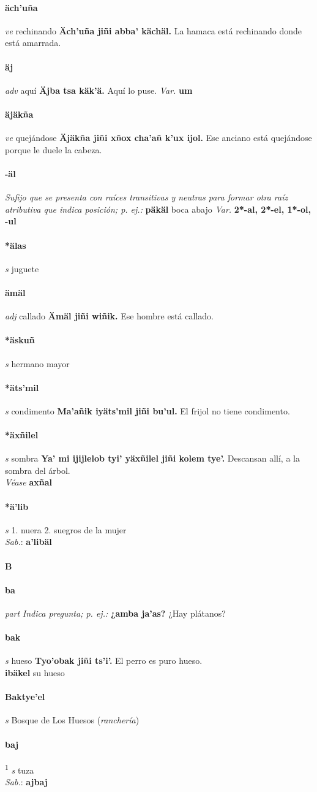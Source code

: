 \documentclass{scrbook}
\newcommand{\entry}[1]{\paragraph{#1}}
\newcommand{\alphaletter}[1]{\addsec{#1}}
\newcommand{\onedefinition}[1]{#1.}
\newcommand{\defsuperscript}[1]{\textsuperscript{1}}
\newcommand{\nontranslationdef}[1]{\textit{#1}}
\newcommand{\partofspeech}[1]{\textit{#1}}
\newcommand{\spanishtranslation}[1]{#1}
\newcommand{\clarification}[1]{(\textit{#1})}
\newcommand{\cholexample}[1]{\textbf{#1}}
\newcommand{\exampletranslation}[1]{#1}
\newcommand{\dialectvariant}[1]{\\\textit{#1}:}
\newcommand{\dialectword}[1]{\textbf{#1}}
\newcommand{\alsosee}[1]{\\\textit{Véase} \textbf{#1}}
\newcommand{\secondaryentry}[1]{\\\textbf{#1}}
\newcommand{\secondtranslation}[1]{#1}
\newcommand{\variation}[1]{\textit{Var.} \textbf{#1}}
\begin{document}
\begin{multicols}{2}
\entry{äch'uña}
\partofspeech{ve}
\spanishtranslation{rechinando}
\cholexample{Äch'uña jiñi abba' kächäl.}
\exampletranslation{La hamaca está rechinando donde está amarrada.}

\entry{äj}
\partofspeech{adv}
\spanishtranslation{aquí}
\cholexample{Äjba tsa käk'ä.}
\exampletranslation{Aquí lo puse.}
\variation{um}

\entry{äjäkña}
\partofspeech{ve}
\spanishtranslation{quejándose}
\cholexample{Äjäkña jiñi xñox cha'añ k'ux ijol.}
\exampletranslation{Ese anciano está quejándose porque le duele la cabeza.}

\entry{-äl}
\nontranslationdef{Sufijo que se presenta con raíces transitivas y neutras para formar otra raíz atributiva que indica posición; p. ej.:}
\cholexample{päkäl}
\exampletranslation{boca abajo}
\variation{2*-al, 2*-el, 1*-ol, -ul}

\entry{*älas}
\partofspeech{s}
\spanishtranslation{juguete}

\entry{ämäl}
\partofspeech{adj}
\spanishtranslation{callado}
\cholexample{Ämäl jiñi wiñik.}
\exampletranslation{Ese hombre está callado.}

\entry{*äskuñ}
\partofspeech{s}
\spanishtranslation{hermano mayor}

\entry{*äts'mil}
\partofspeech{s}
\spanishtranslation{condimento}
\cholexample{Ma'añik iyäts'mil jiñi bu'ul.}
\exampletranslation{El frijol no tiene condimento.}

\entry{*äxñilel}
\partofspeech{s}
\spanishtranslation{sombra}
\cholexample{Ya' mi ijijlelob tyi' yäxñilel jiñi kolem tye'.}
\exampletranslation{Descansan allí, a la sombra del árbol.}
\alsosee{axñal}

\entry{*ä'lib}
\partofspeech{s}
\onedefinition{1}
\spanishtranslation{nuera}
\onedefinition{2}
\spanishtranslation{suegros de la mujer}
\dialectvariant{Sab.}
\dialectword{a'libäl}

\entry{B}
\alphaletter{B}

\entry{ba}
\partofspeech{part}
\nontranslationdef{Indica pregunta; p. ej.:}
\cholexample{¿amba ja'as?}
\exampletranslation{¿Hay plátanos?}

\entry{bak}
\partofspeech{s}
\spanishtranslation{hueso}
\cholexample{Tyo'obak jiñi ts'i'.}
\exampletranslation{El perro es puro hueso.}
\secondaryentry{ibäkel}
\secondtranslation{su hueso}

\entry{Baktye'el}
\partofspeech{s}
\spanishtranslation{Bosque de Los Huesos}
\clarification{ranchería}

\entry{baj}
\defsuperscript{1}
\partofspeech{s}
\spanishtranslation{tuza}
\dialectvariant{Sab.}
\dialectword{ajbaj}


\end{multicols}
\end{document}
